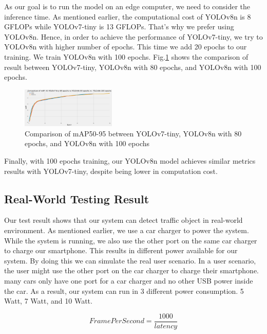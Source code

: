 \documentclass[conference]{IEEEtran}
\begin{document}
As our goal is to run the model on an edge computer, we need to consider the inference time. As mentioned earlier, the computational cost of YOLOv8n is 8 GFLOPs while YOLOv7-tiny is 13 GFLOPs.
That's why we prefer using YOLOv8n. Hence, in order to achieve the performance of YOLOv7-tiny, we try to YOLOv8n with higher number of epochs.
This time we add 20 epochs to our training. We train YOLOv8n with 100 epochs. Fig.\ref{fig:YOLOv7vsYOLOv8,80,100} shows the comparison of result between YOLOv7-tiny, YOLOv8n with 80 epochs, and YOLOv8n with 100 epochs.
\begin{figure}[h!]
\centering
\includegraphics[width=0.4\textwidth,keepaspectratio]{YOLOv7vs YOLOv8,80,100.png}
\caption{Comparison of mAP50-95 between YOLOv7-tiny, YOLOv8n with 80 epochs, and YOLOv8n with 100 epochs}
\label{fig:YOLOv7vsYOLOv8,80,100}
\end{figure}
Finally, with 100 epochs training, our YOLOv8n model achieves similar metrics results with YOLOv7-tiny, despite being lower in computation cost.

\subsection{Real-World Testing Result}
Our test result shows that our system can detect traffic object in real-world  environment.
As mentioned earlier, we use a car charger to power the system. While the system is running, we also use the other port on the same car charger to charge our smartphone. This results in different power available for our system.
By doing this we can simulate the real user scenario. In a user scenario, the user might use the other port on the car charger to charge their smartphone. many cars only have one port for a car charger and no other USB power inside the car.
As a result, our system can run in 3 different power consumption. 5 Watt, 7 Watt, and 10 Watt.

\begin{equation}\label{FPS}
    Frame Per Second = \frac{1000}{latency}
\end{equation}
\end{document}
